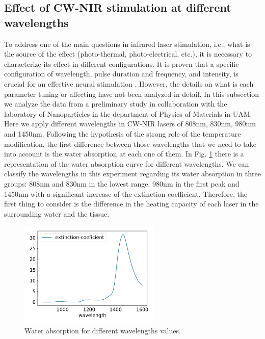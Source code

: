 \subsection{Effect of CW-NIR stimulation at different wavelengths}
\label{subsec:wavelengths}
To address one of the main questions in infrared laser stimulation, i.e., what is the source of the effect (photo-thermal, photo-electrical, etc.), it is necessary to characterize its effect in different configurations. It is proven that a specific configuration of wavelength, pulse duration and frequency, and intensity, is crucial for an effective neural stimulation \parencite{izzo_optical_2007,wells_biophysical_2007}. However, the details on what is each parameter tuning or affecting  have not been analyzed in detail. In this subsection we analyze the data from a preliminary study in collaboration with the laboratory of Nanoparticles in the department of Physics of Materials in UAM. Here we apply different wavelengths in CW-NIR lasers of 808nm, 830nm, 980nm and 1450nm. Following the hypothesis of the strong role of the temperature modification, the first difference between those wavelengths that we need to take into account is the water absorption at each one of them. In Fig. \ref{fig:water absorption} there is a representation of the water absorption curve for different wavelengths. We can classify the wavelengths in this experiment regarding its water absorption in three groups: 808nm and 830nm in the lowest range; 980nm in the first peak and 1450nm with a significant increase of the extinction coefficient. Therefore, the first thing to consider is the difference in the heating capacity of each laser in the surrounding water and the tissue. 

\begin{figure}[hbt]
	\centering
	\includegraphics[width=0.6\textwidth]{img/laser/wavelength/water_absoption_wavelength.pdf}
    \caption{Water absorption for different wavelengths values.}
    \label{fig:water absorption}
\end{figure}


